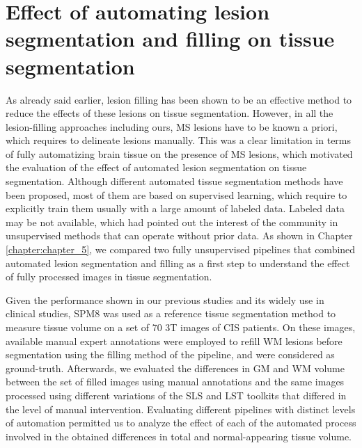 \section{Effect of automating lesion segmentation and filling on  tissue segmentation}
\label{sec:label}


As already said earlier, lesion filling has been shown to be an effective method to reduce the effects of these lesions on tissue segmentation. However, in all the lesion-filling approaches including ours, MS lesions have to be known a priori, which requires to delineate lesions manually. This was a clear limitation in terms of fully automatizing brain tissue on the presence of MS lesions, which motivated the evaluation of the effect of automated lesion segmentation on tissue segmentation. Although different automated tissue segmentation methods have been proposed, most of them are based on supervised learning, which require to explicitly train them usually with a large amount of labeled data. Labeled data may be not available, which had pointed out the interest of the community in unsupervised methods that can operate without prior data. As shown in Chapter \ref{chapter:chapter_5}, we compared two fully unsupervised pipelines that combined automated lesion segmentation and filling as a first step to understand the effect of fully processed images in tissue segmentation. 
 
Given the performance shown in our previous studies and its widely use in clinical studies, SPM8 was used as a reference tissue segmentation method to measure tissue volume on a set of 70 3T images of CIS patients. On these images, available manual expert annotations were employed to refill WM lesions before segmentation using the filling method of the pipeline, and were considered as ground-truth. Afterwards, we evaluated the differences in GM and WM volume between the set of filled images using manual annotations and the same images processed using different variations of the SLS and LST toolkits that differed in the level of manual intervention.  Evaluating different pipelines with distinct levels of automation  permitted us to analyze the effect of each of the automated process involved in the obtained differences in total and normal-appearing tissue volume.  

